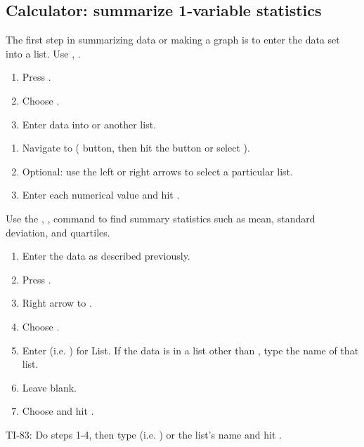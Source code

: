 \subsection{Calculator: summarize 1-variable statistics}
\label{TIsummarizedata}

\begin{termBox}{
The first step in summarizing data or making a graph is to  enter the data set into a list. Use , .
\begin{enumerate}
\setlength{\itemsep}{0mm}
\item Press .
\item Choose .
\item Enter data into  or another list.
\end{enumerate}
}
\end{termBox}

\begin{termBox}{
\begin{enumerate}
\setlength{\itemsep}{0mm}
\item Navigate to  ( button, then hit the  button or select ).
\item Optional: use the left or right arrows to select a particular list.
\item Enter each numerical value and hit .
\end{enumerate}
}
\end{termBox}


\begin{termBox}{
Use the , ,  command to find summary statistics such as mean, standard deviation, and quartiles.
\begin{enumerate}
\setlength{\itemsep}{0mm}
\item Enter the data as described previously.
\item Press .
\item Right arrow to .
\item Choose .
\item Enter  (i.e.  ) for List. If the data is in a list other than , type the name of that list.
\item Leave  blank.
\item Choose  and hit .
\end{enumerate}
TI-83: Do steps 1-4, then type  (i.e.  ) or the list's name and hit .
}
\end{termBox}

